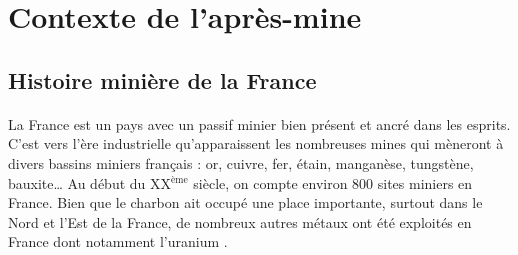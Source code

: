 \documentclass{article}
\begin{document}


\newpage
{}
\section{Contexte de l’après-mine}

\subsection{Histoire minière de la France}

\paragraph{} La France est un pays avec un passif minier bien présent et ancré dans les esprits. C’est vers l’ère industrielle qu’apparaissent les nombreuses mines qui mèneront à divers bassins miniers français : or, cuivre, fer, étain, manganèse, tungstène, bauxite… Au début du XX$^\text{ème}$ siècle, on compte environ 800 sites miniers en France. Bien que le charbon ait occupé une place importante, surtout dans le Nord et l'Est de la France, de nombreux autres métaux ont été exploités en France dont notamment l’uranium \cite{ledoux_notions_2020}. 


\end{document}
